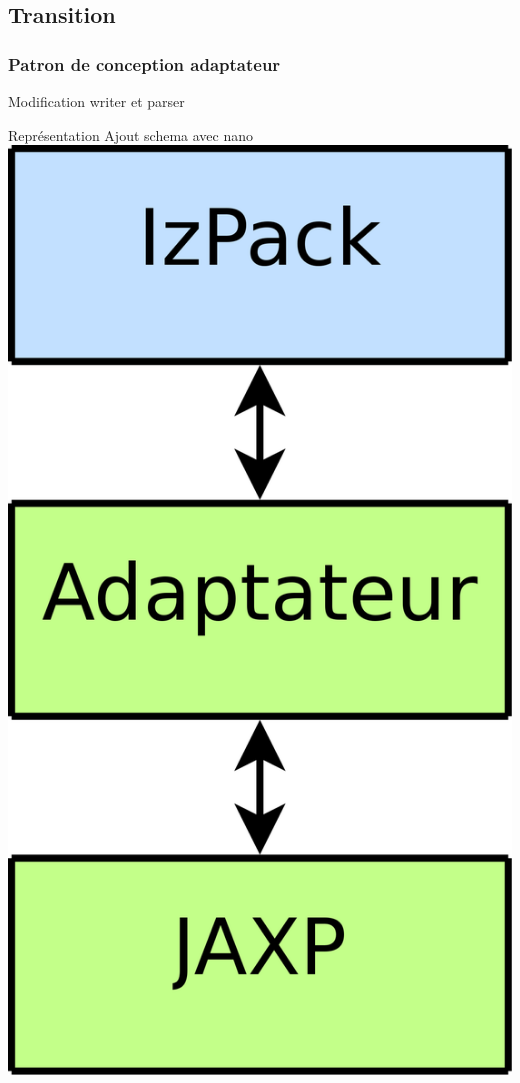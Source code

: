 \subsection{Transition}
\begin{frame}
\frametitle{Patron de conception adaptateur}
Modification writer et parser
\begin{minipage}[c]{.3\linewidth}
\begin{beamerboxesrounded}[shadow=true]{Représentation}
	\centering
	Ajout schema avec nano
	\includegraphics[width=.8\linewidth]{../image/avecAdaptateur.png}
\end{beamerboxesrounded}
\end{minipage}
\hfill
\begin{minipage}[c]{.6\linewidth}
\begin{minipage}[c]{\linewidth}

\end{minipage}
\end{minipage}
\end{frame}
